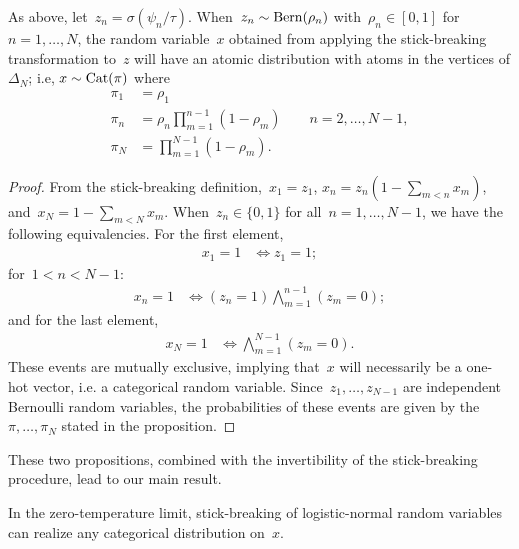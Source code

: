\begin{proposition}
  \label{prop:categorical}
  As above, let~${z_n=\sigma(\psi_n / \tau)}$.
  When~${z_n \sim \mathrm{Bern}(\rho_n)}$
  with~${\rho_n \in [0,1]}$ for~${n=1, \ldots, N}$, the random
  variable~$x$ obtained from applying the stick-breaking
  transformation to~$z$ will have an atomic distribution with atoms
  in the vertices of $\Delta_{N}$; i.e,
  ${x \sim \mathrm{Cat}(\pi)}$ where
  \begin{align*}
    \pi_1 &= \rho_1 \\
    \pi_n &=  \rho_n \prod_{m=1}^{n-1} (1-\rho_m)  \qquad
          n=2, \ldots, N-1, \\
    \pi_N &= \prod_{m=1}^{N-1} (1-\rho_m).
\end{align*}
\end{proposition}

\begin{proof}
  From the stick-breaking definition,~${x_1 = z_1}$,
  ${x_n = z_n (1- \sum_{m < n} x_m)}$,
  and~${x_N = 1-\sum_{m < N} x_m}$.
  When~${z_n \in \{0,1\}}$ for all~${n = 1, \ldots, N-1}$,
  we have the following equivalencies. For the first element,
  \begin{align*}
    x_1 = 1 &\iff z_1 = 1;
  \end{align*}
  for~${1 < n < N-1}:$
  \begin{align*}
    x_n = 1 &\iff (z_n = 1) \bigwedge_{m=1}^{n-1} (z_m = 0);
  \end{align*}
  and for the last element,
  \begin{align*}
    x_N = 1 &\iff \bigwedge_{m=1}^{N-1} (z_m = 0).
  \end{align*}
  These events are mutually exclusive, implying that~$x$ will
  necessarily be a one-hot vector, i.e. a categorical random variable.
  Since~$z_1, \ldots, z_{N-1}$ are independent Bernoulli random
  variables, the probabilities of these events are given
  by the~${\pi, \ldots, \pi_N}$ stated in the proposition. 
\end{proof}

These two propositions, combined with the invertibility of the
stick-breaking procedure, lead to our main result.

\begin{lemma}
  In the zero-temperature limit, stick-breaking of logistic-normal
  random variables can realize any categorical distribution on~$x$.
\end{lemma}

